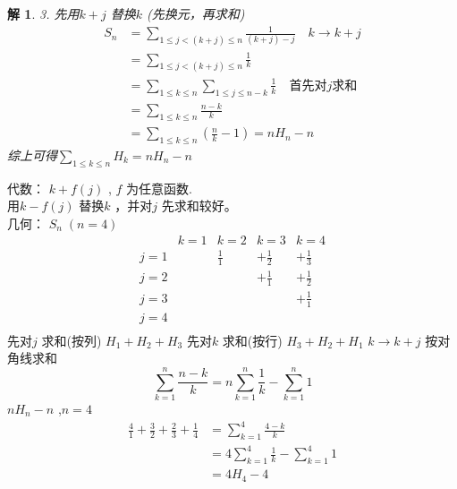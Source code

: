 \documentclass[mode=geye]{elegantnote}
\newtheorem{solve}{解}
\begin{document}
\begin{solve}
    3. 先用$ k+j $ 替换$ k $ (先换元，再求和)
    \begin{align*}
        S_n 
        &= \sum_{1\leqslant j < (k+j)\leqslant n}\frac{1}{(k+j)-j} \quad k\rightarrow k+j \\
        &= \sum_{1\leqslant j < (k+j)\leqslant n}\frac{1}{k} \\
        &= \sum_{1\leqslant k \leqslant n} \sum_{1\leqslant j \leqslant n-k}\frac{1}{k} \quad\text{首先对}j\text{求和} \\
        &= \sum_{1\leqslant k \leqslant n} \frac{n-k}{k}\\
        &= \sum_{1\leqslant k \leqslant n} \left( \frac{n}{k}-1 \right) = n H_n - n
    \end{align*}
    综上可得$ \sum_{1\leqslant k\leqslant n}H_k = n H_n - n $ 
\end{solve}
代数：
$ k+f(j) $ , $ f $ 为任意函数.\\
用$ k-f(j) $ 替换$ k $ ，并对$ j $ 先求和较好。\\
几何：
$ S_n \;(n=4) $ 
\begin{equation*}
    \begin{array}{ccccc}
            & k=1   & k=2   & k=3   & k=4   \\
        j=1 & & \frac{1}{1} & +\frac{1}{2} & +\frac{1}{3} \\
        j=2 & &             & +\frac{1}{1} & +\frac{1}{2} \\
        j=3 & &             &              & +\frac{1}{1} \\
        j=4 & &             &              &              \\
    \end{array}
\end{equation*}
先对$ j $ 求和(按列) $ H_1 + H_2 + H_3 $ 
先对$ k $ 求和(按行) $ H_3 + H_2 + H_1 $ 
$ k\rightarrow k+j $ 按对角线求和 
\begin{equation*}
    \sum_{k=1}^{n}\frac{n-k}{k} = n \sum_{k=1}^{n}\frac{1}{k}-\sum_{k=1}^{n} 1
\end{equation*}
$ nH_n-n $ ,$ n=4 $ 
\begin{align*}
    \frac{4}{1}+\frac{3}{2}+\frac{2}{3}+\frac{1}{4} &= \sum_{k=1}^{4}\frac{4-k}{k} \\ 
    &= 4\sum_{k=1}^{4}\frac{1}{k}-\sum_{k=1}^{4} 1 \\
    &= 4H_4 - 4
\end{align*}
\end{document}
